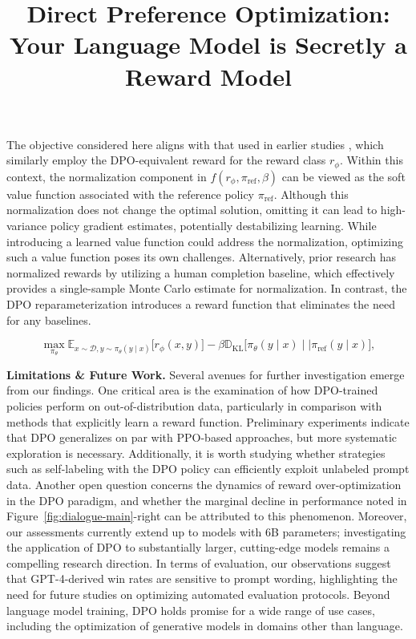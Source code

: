 \title{Direct Preference Optimization: Your Language Model is Secretly a Reward Model}
The objective considered here aligns with that used in earlier studies 
\citep{ziegler2020finetuning, stiennon2022learning, bai2022training, ouyang2022training}, which similarly employ the DPO-equivalent reward for the reward class $r_{\phi}$. Within this context, the normalization component in $f(r_{\phi}, \pi_\text{ref}, \beta)$ can be viewed as the soft value function associated with the reference policy $\pi_\text{ref}$. Although this normalization does not change the optimal solution, omitting it can lead to high-variance policy gradient estimates, potentially destabilizing learning. While introducing a learned value function could address the normalization, optimizing such a value function poses its own challenges. Alternatively, prior research has normalized rewards by utilizing a human completion baseline, which effectively provides a single-sample Monte Carlo estimate for normalization. In contrast, the DPO reparameterization introduces a reward function that eliminates the need for any baselines.

\begin{equation}\label{eq:RL}
\max_{\pi_{\theta}}  \mathbb{E}_{x\sim \mathcal{D}, y\sim \pi_{\theta}(y \mid x)}\bigl[r_{\phi}(x, y)\bigr] - \beta\mathbb{D}_{\textrm{KL}}\bigl[\pi_{\theta}(y\mid x)\mid \mid \pi_\text{ref}(y\mid x)\bigr],
\end{equation}

\textbf{Limitations \& Future Work.} Several avenues for further investigation emerge from our findings. One critical area is the examination of how DPO-trained policies perform on out-of-distribution data, particularly in comparison with methods that explicitly learn a reward function. Preliminary experiments indicate that DPO generalizes on par with PPO-based approaches, but more systematic exploration is necessary. Additionally, it is worth studying whether strategies such as self-labeling with the DPO policy can efficiently exploit unlabeled prompt data. Another open question concerns the dynamics of reward over-optimization in the DPO paradigm, and whether the marginal decline in performance noted in Figure~\ref{fig:dialogue-main}-right can be attributed to this phenomenon. Moreover, our assessments currently extend up to models with 6B parameters; investigating the application of DPO to substantially larger, cutting-edge models remains a compelling research direction. In terms of evaluation, our observations suggest that GPT-4-derived win rates are sensitive to prompt wording, highlighting the need for future studies on optimizing automated evaluation protocols. Beyond language model training, DPO holds promise for a wide range of use cases, including the optimization of generative models in domains other than language.

